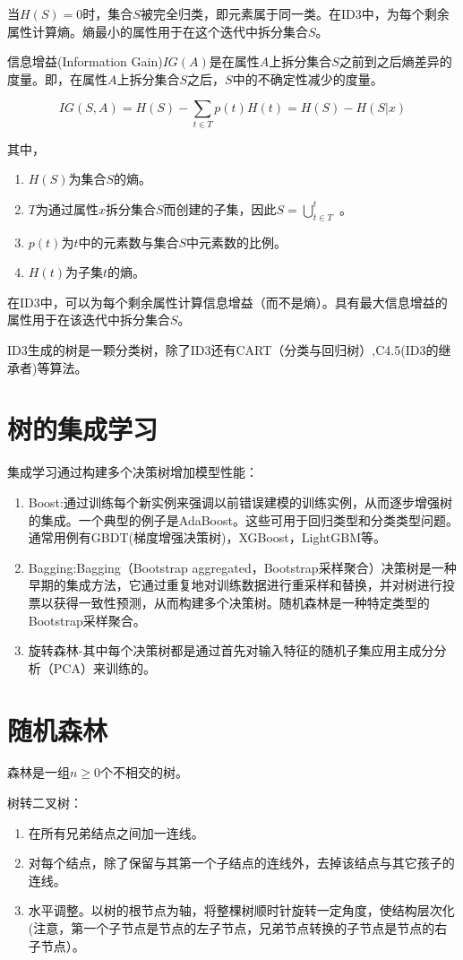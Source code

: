当$H(S)=0$时，集合$S$被完全归类，即元素属于同一类。在ID3中，为每个剩余属性计算熵。熵最小的属性用于在这个迭代中拆分集合$S$。

信息增益(Information Gain)$IG(A)$是在属性$A$上拆分集合$S$之前到之后熵差异的度量。即，在属性$A$上拆分集合$S$之后，$S$中的不确定性减少的度量。

$$IG(S,A)=H(S)-\sum_{t\in T}{p(t)H(t)}=H(S)-H(S|x)$$

其中，
\begin{enumerate}
	\item $H(S)$为集合$S$的熵。
	\item $T$为通过属性$x$拆分集合$S$而创建的子集，因此$S = \bigcup_{t\in T}^{t}$ 。
	\item $p(t)$为$t$中的元素数与集合$S$中元素数的比例。
	\item $H(t)$为子集$t$的熵。
\end{enumerate}
在ID3中，可以为每个剩余属性计算信息增益（而不是熵）。具有最大信息增益的属性用于在该迭代中拆分集合$S$。

ID3生成的树是一颗分类树，除了ID3还有CART（分类与回归树）,C4.5(ID3的继承者)等算法。

\section{树的集成学习}

集成学习通过构建多个决策树增加模型性能：

\begin{enumerate}
	\item Boost:通过训练每个新实例来强调以前错误建模的训练实例，从而逐步增强树的集成。一个典型的例子是AdaBoost。这些可用于回归类型和分类类型问题。通常用例有GBDT(梯度增强决策树)，XGBoost，LightGBM等。
	\item Bagging:Bagging（Bootstrap aggregated，Bootstrap采样聚合）决策树是一种早期的集成方法，它通过重复地对训练数据进行重采样和替换，并对树进行投票以获得一致性预测，从而构建多个决策树。随机森林是一种特定类型的Bootstrap采样聚合。
	\item 旋转森林-其中每个决策树都是通过首先对输入特征的随机子集应用主成分分析（PCA）来训练的。
\end{enumerate}

\section{随机森林}

森林是一组$n \ge 0$个不相交的树。

树转二叉树：
\begin{enumerate}
	\item 在所有兄弟结点之间加一连线。
	\item 对每个结点，除了保留与其第一个子结点的连线外，去掉该结点与其它孩子的连线。
	\item 水平调整。以树的根节点为轴，将整棵树顺时针旋转一定角度，使结构层次化(注意，第一个子节点是节点的左子节点，兄弟节点转换的子节点是节点的右子节点）。
\end{enumerate}

